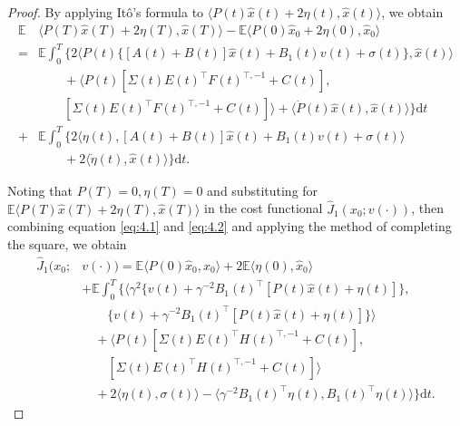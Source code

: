 \documentclass[lettersize,journal]{IEEEtran}
\theoremstyle{plain}
\theoremstyle{definition}
\begin{document}
\begin{proof}
	By applying It\^{o}'s formula to $\langle P(t)\widehat{x}(t) + 2\eta(t),\widehat{x}(t) \rangle$, we obtain
	\begin{equation*}
		\begin{aligned}
			\mathbb{E} &\langle P(T)\widehat{x}(T) + 2\eta(T),\widehat{x}(T) \rangle - \mathbb{E} \langle P(0)\widehat{x}_0 + 2\eta(0),\widehat{x}_0 \rangle \\
			= &\mathbb{E} \int_0^T \Big\{2\langle P(t)\{[A(t) + B(t)]\widehat{x}(t) + B_1(t)v(t) + \sigma(t)\},\widehat{x}(t) \rangle \\
			&\qquad + \langle P(t)[\Sigma(t)E(t)^{\top}F(t)^{\top,-1} + C(t)],\\
			&\qquad [\Sigma(t)E(t)^{\top}F(t)^{\top,-1} + C(t)] \rangle + \langle \dot{P}(t)\widehat{x}(t),\widehat{x}(t) \rangle\Big\} \mathrm{d}t\\
			+& \mathbb{E} \int_0^T \Big\{2\langle \eta(t),[A(t) + B(t)]\widehat{x}(t) + B_1(t)v(t) + \sigma(t) \rangle\\
			&\qquad + 2\langle \dot{\eta}(t),\widehat{x}(t) \rangle \Big\} \mathrm{d}t.
		\end{aligned}
	\end{equation*}
	
	Noting that $P(T) = 0,\eta(T) = 0$ and substituting for $\mathbb{E} \langle P(T)\widehat{x}(T) + 2\eta(T),\widehat{x}(T) \rangle$ in the cost functional $\widehat{J}_1(x_0;v(\cdot))$, then combining equation \eqref{eq:4.1} and \eqref{eq:4.2} and applying the method of completing the square, we obtain
	\begin{equation}\label{eq:4.8}
		\begin{aligned}
			\widehat{J}_1(x_0;&v(\cdot)) = \mathbb{E} \langle P(0)\widehat{x}_0,\widehat{x}_0 \rangle + 2\mathbb{E} \langle \eta(0),\widehat{x}_0 \rangle\\
			&+ \mathbb{E} \int_0^T \Big\{\langle \gamma^2\{v(t) + \gamma^{-2}B_1(t)^{\top}[P(t)\widehat{x}(t) + \eta(t)]\},\\
			&\qquad \{v(t) + \gamma^{-2}B_1(t)^{\top}[P(t)\widehat{x}(t) + \eta(t)]\} \rangle\\
			&\quad + \langle P(t)[\Sigma(t) E(t)^\top H(t)^{\top,-1} + C(t)],\\
			&\qquad [\Sigma(t)E(t)^\top H(t)^{\top,-1} + C(t)] \rangle\\
			&\quad + 2\langle \eta(t),\sigma(t) \rangle - \langle \gamma^{-2} B_1(t)^\top \eta(t),B_1(t)^\top \eta(t) \rangle\Big\} \mathrm{d}t.
		\end{aligned}
	\end{equation}
	

\end{proof}
\end{document}
